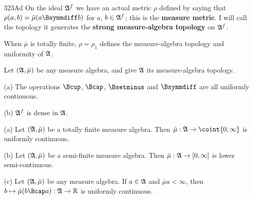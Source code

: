 \spheader 323Ad 
On the ideal $\frak A^f$ we have an actual metric $\rho$
defined by saying that $\rho(a,b)=\bar\mu(a\Bsymmdiff b)$ for $a$,
$b\in\frak A^f$;  this is the {\bf measure metric}. %
I will call the topology it generates the {\bf strong measure-algebra
topology} on $\frak A^f$.

When $\bar\mu$ is totally finite,
$\rho=\rho_1$ defines the measure-algebra topology and uniformity of
$\frak A$.

 Let $(\frak A,\bar\mu)$ be any measure
algebra, and give $\frak A$ its measure-algebra topology.

(a) The operations $\Bcup$, $\Bcap$, $\Bsetminus$ and $\Bsymmdiff$ are
all uniformly continuous.

(b) $\frak A^f$ is dense in $\frak A$.


 (a) Let $(\frak A,\bar\mu)$ be a totally
finite measure algebra.   Then $\bar\mu:\frak A\to\coint{0,\infty}$ is
uniformly continuous.

(b) Let $(\frak A,\bar\mu)$ be a semi-finite measure algebra.   Then
$\bar\mu:\frak A\to[0,\infty]$ is lower semi-continuous.

(c) Let $(\frak A,\bar\mu)$ be any measure algebra.   If $a\in\frak A$
and $\bar\mu a<\infty$, then
$b\mapsto\bar\mu(b\Bcap a):\frak A\to\Bbb R$ is uniformly continuous.


